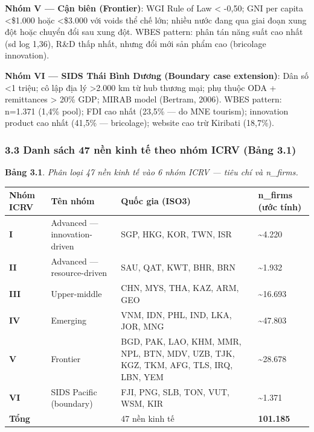 \documentclass[12pt,a4paper]{article}
\begin{document}
\textbf{Nhóm V --- Cận biên (Frontier)}: WGI Rule of Law \textless{}
-0,50; GNI per capita \textless\$1.000 hoặc \textless\$3.000 với voids
thể chế lớn; nhiều nước đang qua giai đoạn xung đột hoặc chuyển đổi sau
xung đột. WBES pattern: phân tán năng suất cao nhất (sd log 1,36), R\&D
thấp nhất, nhưng đổi mới sản phẩm cao (bricolage innovation).

\textbf{Nhóm VI --- SIDS Thái Bình Dương (Boundary case extension)}: Dân
số \textless1 triệu; cô lập địa lý \textgreater2.000 km từ hub thương
mại; phụ thuộc ODA + remittances \textgreater{} 20\% GDP; MIRAB model
(Bertram, 2006). WBES pattern: n=1.371 (1,4\% pool); FDI cao nhất
(23,5\% --- do MNE tourism); innovation product cao nhất (41,5\% ---
bricolage); website cao trừ Kiribati (18,7\%).

\hypertarget{33-danh-suxe1ch-47-nux1ec1n-kinh-tux1ebf-theo-nhuxf3m-icrv-bux1ea3ng-31}{%
\subsubsection{3.3 Danh sách 47 nền kinh tế theo nhóm ICRV (Bảng
3.1)}\label{33-danh-suxe1ch-47-nux1ec1n-kinh-tux1ebf-theo-nhuxf3m-icrv-bux1ea3ng-31}}

\textbf{Bảng 3.1}. \emph{Phân loại 47 nền kinh tế vào 6 nhóm ICRV ---
tiêu chí và n\_firms.}

\begin{longtable}[]{@{}llll@{}}
\toprule\noalign{}
Nhóm ICRV & Tên nhóm & Quốc gia (ISO3) & n\_firms (ước tính) \\
\midrule\noalign{}
\endhead
\bottomrule\noalign{}
\endlastfoot
\textbf{I} & Advanced --- innovation-driven & SGP, HKG, KOR, TWN, ISR &
\textasciitilde4.220 \\
\textbf{II} & Advanced --- resource-driven & SAU, QAT, KWT, BHR, BRN &
\textasciitilde1.932 \\
\textbf{III} & Upper-middle & CHN, MYS, THA, KAZ, ARM, GEO &
\textasciitilde16.693 \\
\textbf{IV} & Emerging & VNM, IDN, PHL, IND, LKA, JOR, MNG &
\textasciitilde47.803 \\
\textbf{V} & Frontier & BGD, PAK, LAO, KHM, MMR, NPL, BTN, MDV, UZB,
TJK, KGZ, TKM, AFG, TLS, IRQ, LBN, YEM & \textasciitilde28.678 \\
\textbf{VI} & SIDS Pacific (boundary) & FJI, PNG, SLB, TON, VUT, WSM,
KIR & \textasciitilde1.371 \\
\textbf{Tổng} & & 47 nền kinh tế & \textbf{101.185} \\
\end{longtable}
\end{document}

